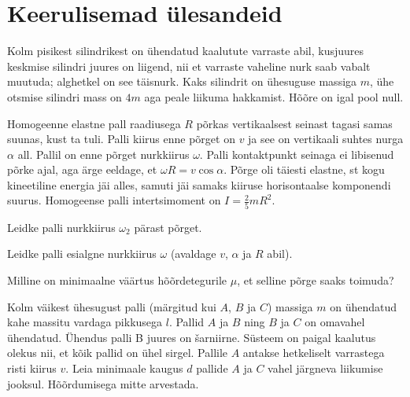 \documentclass[a4paper,11pt,twocolumn]{article}
\begin{document}
\section{Keerulisemad ülesandeid}
\begin{question}[dun6][7cm]
	Kolm pisikest silindrikest on ühendatud kaalutute varraste abil, kusjuures keskmise silindri juures on liigend, nii et varraste vaheline nurk saab vabalt muutuda; alghetkel on see täisnurk. Kaks silindrit on ühesuguse massiga $ m $, ühe otsmise silindri mass on $ 4m $ aga peale liikuma hakkamist. Hõõre on igal pool null.
\end{question}
\begin{question}[E-S 2015, P7]
	Homogeenne elastne pall raadiusega $ R $ põrkas vertikaalsest seinast tagasi samas suunas, kust ta tuli. Palli kiirus enne põrget on $ v $ ja see on vertikaali suhtes nurga $ \alpha $ all. Pallil on enne põrget nurkkiirus $ \omega $. Palli kontaktpunkt seinaga ei libisenud põrke ajal, aga ärge eeldage, et $ \omega R = v \cos \alpha $. Põrge oli täiesti elastne, st kogu kineetiline energia jäi alles, samuti jäi samaks kiiruse horisontaalse komponendi suurus. Homogeense palli intertsimoment on $ I = \frac{2}{5} mR^2 $.
	\begin{subquestion}
		\item Leidke palli nurkkiirus $ \omega_2 $ pärast põrget.
		\item Leidke palli esialgne nurkkiirus $ \omega $ (avaldage $ v $, $ \alpha $ ja $ R $ abil).
		\item Milline on minimaalne väärtus hõõrdetegurile $ \mu $, et selline põrge saaks toimuda?
	\end{subquestion}
\end{question}
\begin{question}[EuPhO 2018, T1]
	Kolm väikest ühesugust palli (märgitud kui $ A $, $ B $ ja $ C $) massiga $ m $ on ühendatud kahe massitu vardaga pikkusega $ l $. Pallid $ A $ ja $ B $ ning $ B $ ja $ C $ on omavahel ühendatud. Ühendus palli B juures on šarniirne. Süsteem on paigal kaalutus olekus nii, et kõik pallid on ühel sirgel. Pallile $ A $ antakse hetkeliselt varrastega risti kiirus $ v $. Leia minimaale kaugus $ d $ pallide $ A $ ja $ C $ vahel järgneva liikumise jooksul. Hõõrdumisega mitte arvestada.
\end{question}
\end{document}
